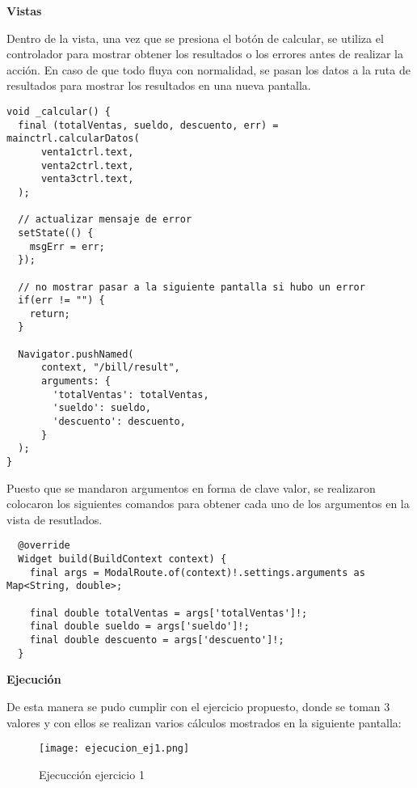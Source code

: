 \textbf{Vistas}

Dentro de la vista, una vez que se presiona el botón de calcular, se utiliza el controlador para mostrar obtener los resultados o los errores antes de realizar la acción. En caso de que todo fluya con normalidad, se pasan los datos a la ruta de resultados para mostrar los resultados en una nueva pantalla.

\begin{center}
\begin{lstlisting}
void _calcular() {
  final (totalVentas, sueldo, descuento, err) = mainctrl.calcularDatos(
      venta1ctrl.text,
      venta2ctrl.text,
      venta3ctrl.text,
  );

  // actualizar mensaje de error
  setState(() {
    msgErr = err;
  });

  // no mostrar pasar a la siguiente pantalla si hubo un error
  if(err != "") {
    return;
  }

  Navigator.pushNamed(
      context, "/bill/result",
      arguments: {
        'totalVentas': totalVentas,
        'sueldo': sueldo,
        'descuento': descuento,
      }
  );
}
\end{lstlisting}
\end{center}

Puesto que se mandaron argumentos en forma de clave valor, se realizaron colocaron los siguientes comandos para obtener cada uno de los argumentos en la vista de resutlados.

\begin{center}
\begin{lstlisting}
  @override
  Widget build(BuildContext context) {
    final args = ModalRoute.of(context)!.settings.arguments as Map<String, double>;

    final double totalVentas = args['totalVentas']!;
    final double sueldo = args['sueldo']!;
    final double descuento = args['descuento']!;
  }
\end{lstlisting}
\end{center}

\textbf{Ejecución}

De esta manera se pudo cumplir con el ejercicio propuesto, donde se toman 3 valores y con ellos se realizan varios cálculos mostrados en la siguiente pantalla:

\begin{figure}[H]
    \centering
    \texttt{[image: ejecucion\_ej1.png]}
    \caption{Ejecucción ejercicio 1}
    \label{fig:ej1_ejecuccion}
\end{figure}